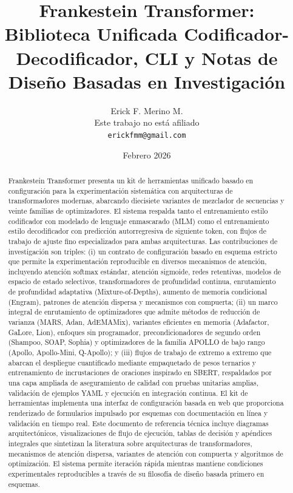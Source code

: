 \documentclass[11pt,a4paper]{article}
\title{Frankestein Transformer:\\Biblioteca Unificada Codificador-Decodificador, CLI y Notas de Diseño Basadas en Investigación}
\author{
Erick F. Merino M. \\
Este trabajo no está afiliado \\
\texttt{erickfmm@gmail.com}
}
\date{Febrero 2026}
\begin{document}
\maketitle

\begin{abstract}
Frankestein Transformer presenta un kit de herramientas unificado basado en configuración para la experimentación sistemática con arquitecturas de transformadores modernas, abarcando diecisiete variantes de mezclador de secuencias y veinte familias de optimizadores. El sistema respalda tanto el entrenamiento estilo codificador con modelado de lenguaje enmascarado (MLM) como el entrenamiento estilo decodificador con predicción autorregresiva de siguiente token, con flujos de trabajo de ajuste fino especializados para ambas arquitecturas. Las contribuciones de investigación son triples: (i) un contrato de configuración basado en esquema estricto que permite la experimentación reproducible en diversos mecanismos de atención, incluyendo atención softmax estándar, atención sigmoide, redes retentivas, modelos de espacio de estado selectivos, transformadores de profundidad continua, enrutamiento de profundidad adaptativa (Mixture-of-Depths), aumento de memoria condicional (Engram), patrones de atención dispersa y mecanismos con compuerta; (ii) un marco integral de enrutamiento de optimizadores que admite métodos de reducción de varianza (MARS, Adan, AdEMAMix), variantes eficientes en memoria (Adafactor, GaLore, Lion), enfoques sin programador, precondicionadores de segundo orden (Shampoo, SOAP, Sophia) y optimizadores de la familia APOLLO de bajo rango (Apollo, Apollo-Mini, Q-Apollo); y (iii) flujos de trabajo de extremo a extremo que abarcan el despliegue cuantificado mediante empaquetado de pesos ternarios y entrenamiento de incrustaciones de oraciones inspirado en SBERT, respaldados por una capa ampliada de aseguramiento de calidad con pruebas unitarias amplias, validación de ejemplos YAML y ejecución en integración continua. El kit de herramientas implementa una interfaz de configuración basada en web que proporciona renderizado de formularios impulsado por esquemas con documentación en línea y validación en tiempo real. Este documento de referencia técnica incluye diagramas arquitectónicos, visualizaciones de flujo de ejecución, tablas de decisión y apéndices integrales que sintetizan la literatura sobre arquitecturas de transformadores, mecanismos de atención dispersa, variantes de atención con compuerta y algoritmos de optimización. El sistema permite iteración rápida mientras mantiene condiciones experimentales reproducibles a través de su filosofía de diseño basada primero en esquemas.
\end{abstract}
\end{document}
